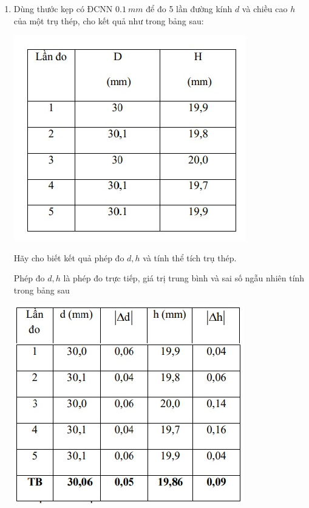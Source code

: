 \begin{enumerate}[label=\bfseries Bài \arabic*:,leftmargin=1.5cm]
	\item {}
	
	
	{
		Dùng thước kẹp có ĐCNN $\SI{0,1}{mm}$ để đo 5 lần đường kính $d$ và chiều cao $h$ của một trụ thép, cho kết quả như trong bảng sau:
		
		\begin{center}
			\includegraphics[scale=1]{../figs/VN10-2022-PH-TP003-8.jpg}
		\end{center}
		
		Hãy cho biết kết quả phép đo $d, h$ và tính thể tích trụ thép.
	}
	
	\hideall
	{	
		Phép đo $d, h$ là phép đo trực tiếp, giá trị
		trung bình và sai số ngẫu nhiên tính trong
		bảng sau
		
		\begin{center}
			\includegraphics[scale=1]{../figs/VN10-2022-PH-TP003-9.jpg}
		\end{center}
		
}
\end{enumerate}
